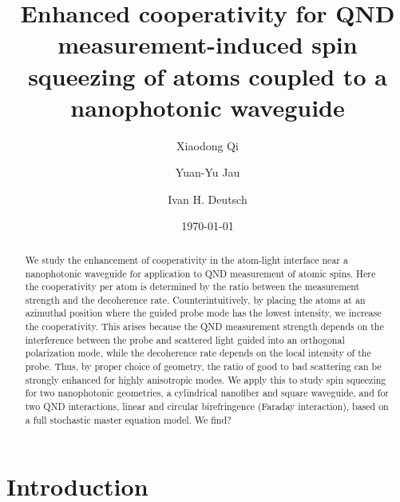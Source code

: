 \documentclass[aps,pra,twocolumn,superscriptaddress]{revtex4-1} %
\begin{document}
\title{Enhanced cooperativity for QND measurement-induced spin squeezing of atoms coupled to a nanophotonic waveguide}
\author{Xiaodong Qi}
\author{Yuan-Yu Jau}
\author{Ivan H. Deutsch}
\date{\today}

\begin{abstract}
We study the enhancement of cooperativity in the atom-light interface near a nanophotonic waveguide for application to QND measurement of atomic spins.  Here the cooperativity per atom is determined by the ratio between the  measurement strength and the decoherence rate.  Counterintuitively, by placing the atoms at an azimuthal position where the guided probe mode has the lowest intensity, we increase the cooperativity.  This arises because the QND measurement strength depends on the interference between the probe and scattered light guided into an orthogonal polarization mode, while the decoherence rate depends on the local intensity of the probe.  Thus, by proper choice of geometry, the ratio of good to bad scattering can be strongly enhanced for highly anisotropic modes. We apply this to study spin squeezing for two nanophotonic geometries, a cylindrical nanofiber and square waveguide, and for two QND interactions, linear and circular birefringence (Faraday interaction), based on a full stochastic master equation model.  We find?\end{abstract}

\maketitle

\section{Introduction}
\end{document}
